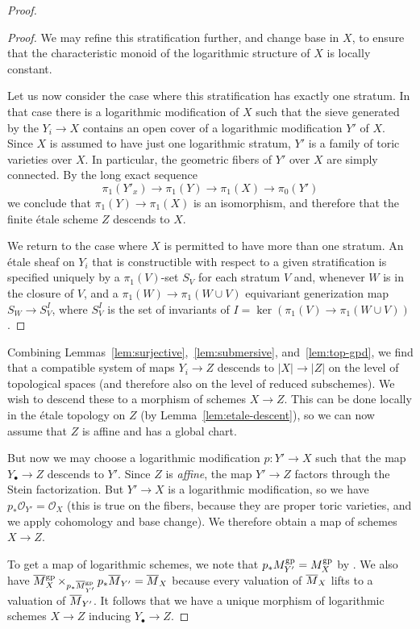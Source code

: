 \documentclass[12pt]{amsart}
\theoremstyle{definition}
\theoremstyle{remark}
\def\overnorm#1{\overline{#1}\vphantom{#1}}
\begin{document}
\begin{proof}
\begin{proof}
We may refine this stratification further, and change base in $X$, to ensure that the characteristic monoid of the logarithmic structure of $X$ is locally constant.

Let us now consider the case where this stratification has exactly one stratum.  In that case there is a logarithmic modification of $X$ such that the sieve generated by the $Y_i \to X$ contains an open cover of a logarithmic modification $Y'$ of $X$.  Since $X$ is assumed to have just one logarithmic stratum, $Y'$ is a family of toric varieties over $X$.  In particular, the geometric fibers of $Y'$ over $X$ are simply connected.  By the long exact sequence
\begin{equation*}
\pi_1(Y'_x) \to \pi_1(Y) \to \pi_1(X) \to \pi_0(Y')
\end{equation*}
we conclude that $\pi_1(Y) \to \pi_1(X)$ is an isomorphism, and therefore that the finite \'etale scheme $Z$ descends to $X$.

We return to the case where $X$ is permitted to have more than one stratum.  An \'etale sheaf on $Y_i$ that is constructible with respect to a given stratification is specified uniquely by a $\pi_1(V)$-set $S_V$ for each stratum $V$ and, whenever $W$ is in the closure of $V$, and a $\pi_1(W) \to \pi_1(W \cup V)$ equivariant generization map $S_W \to S_V^I$, where $S_V^I$ is the set of invariants of $I = \ker(\pi_1(V) \to \pi_1(W \cup V))$.
\end{proof}

Combining Lemmas~\ref{lem:surjective},~\ref{lem:submersive}, and~\ref{lem:top-gpd}, we find that a compatible system of maps $Y_i \to Z$ descends to $|X| \to |Z|$ on the level of topological spaces (and therefore also on the level of reduced subschemes).  We wish to descend these to a morphism of schemes $X \to Z$.  This can be done locally in the \'etale topology on $Z$ (by Lemma~\ref{lem:etale-descent}), so we can now assume that $Z$ is affine and has a global chart.

But now we may choose a logarithmic modification $p : Y' \to X$ such that the map $Y_\bullet \to Z$ descends to $Y'$.  Since $Z$ is \emph{affine}, the map $Y' \to Z$ factors through the Stein factorization.  But $Y' \to X$ is a logarithmic modification, so we have $p_\ast \mathcal O_{Y'} = \mathcal O_X$ (this is true on the fibers, because they are proper toric varieties, and we apply cohomology and base change).  We therefore obtain a map of schemes $X \to Z$.

To get a map of logarithmic schemes, we note that $p_\ast M_{Y'}^{\rm gp} = M_X^{\rm gp}$ by \cite[Theorem~4.4.1]{logpic}.  We also have $\overnorm M_X^{\rm gp} \mathop\times_{p_\ast \overnorm M_{Y'}^{\rm gp}} p_\ast \overnorm M_{Y'} = \overnorm M_X$ because every valuation of $\overnorm M_X$ lifts to a valuation of $\overnorm M_{Y'}$.  It follows that we have a unique morphism of logarithmic schemes $X \to Z$ inducing $Y_\bullet \to Z$.
\end{proof}
\end{document}
